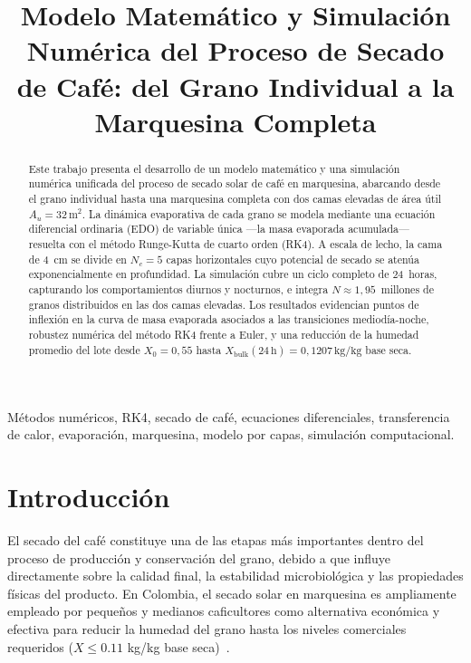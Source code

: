 \documentclass[conference]{IEEEtran}
\title{
Modelo Matemático y Simulación Numérica del Proceso de Secado de Café: del Grano Individual a la Marquesina Completa
}
\author{

\IEEEauthorblockN{
Jose Andres Daza Gallego,
Jose Miguel Calderon Castano,
Juan David Vega Canizares,
Valentina Sanchez Loaiza
}

\IEEEauthorblockA{
Facultad de Ingeniería \\
Politécnico Colombiano Jaime Isaza Cadavid \\
Rionegro, Antioquia, Colombia
}

}
\begin{document}
\maketitle

\begin{abstract}

Este trabajo presenta el desarrollo de un modelo matemático y una simulación numérica unificada del proceso de secado solar de café en marquesina, abarcando desde el grano individual hasta una marquesina completa con dos camas elevadas de área útil $A_u = 32\,\text{m}^2$. La dinámica evaporativa de cada grano se modela mediante una ecuación diferencial ordinaria (EDO) de variable única —la masa evaporada acumulada— resuelta con el método Runge-Kutta de cuarto orden (RK4). A escala de lecho, la cama de 4~cm se divide en $N_c = 5$ capas horizontales cuyo potencial de secado se atenúa exponencialmente en profundidad. La simulación cubre un ciclo completo de 24~horas, capturando los comportamientos diurnos y nocturnos, e integra $N \approx 1{,}95$~millones de granos distribuidos en las dos camas elevadas. Los resultados evidencian puntos de inflexión en la curva de masa evaporada asociados a las transiciones mediodía-noche, robustez numérica del método RK4 frente a Euler, y una reducción de la humedad promedio del lote desde $X_0 = 0{,}55$ hasta $X_{\text{bulk}}(24\,\text{h}) = 0{,}1207\,\text{kg/kg}$ base seca.

\end{abstract}

\begin{IEEEkeywords}

Métodos numéricos,
RK4,
secado de café,
ecuaciones diferenciales,
transferencia de calor,
evaporación,
marquesina,
modelo por capas,
simulación computacional.

\end{IEEEkeywords}

\section{Introducción}

El secado del café constituye una de las etapas más importantes dentro del proceso de producción y conservación del grano, debido a que influye directamente sobre la calidad final, la estabilidad microbiológica y las propiedades físicas del producto. En Colombia, el secado solar en marquesina es ampliamente empleado por pequeños y medianos caficultores como alternativa económica y efectiva para reducir la humedad del grano hasta los niveles comerciales requeridos ($X \leq 0.11$ kg/kg base seca)~\cite{parra08}.
\end{document}
